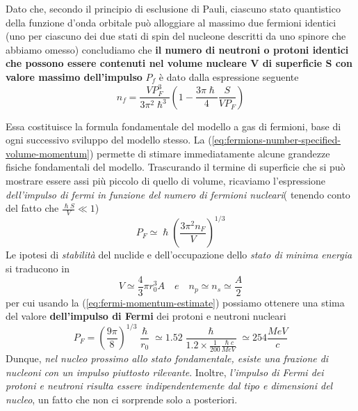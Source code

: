 Dato che, secondo il principio di esclusione di Pauli, ciascuno stato quantistico della funzione d’onda orbitale può alloggiare al massimo due fermioni identici (uno per ciascuno dei due stati di spin del nucleone descritti da uno spinore che abbiamo omesso) concludiamo che \textbf{il numero di neutroni o protoni identici che possono essere contenuti nel volume nucleare V di superficie S con valore massimo dell’impulso} $P_f$ è dato dalla espressione seguente
\begin{equation}
	n_{f} = \frac{V P_{F}^{3}}{3 \pi^{2}\hslash^{3}} \left( 1 - \frac{3\pi \hslash}{4} \frac{S}{VP_{F}} \right)
	\label{eq:fermions-number-specified-volume-momentum}
\end{equation}

Essa costituisce la formula fondamentale del modello a gas di fermioni, base di ogni successivo sviluppo del modello stesso.
La (\ref{eq:fermions-number-specified-volume-momentum}) permette di stimare immediatamente alcune grandezze fisiche fondamentali del modello. Trascurando il termine di superficie che si può mostrare essere assi più piccolo di quello di volume, ricaviamo l’espressione \emph{dell’impulso di fermi in funzione del numero di fermioni nucleari}( tenendo conto del fatto che $\frac{\hslash S}{V} \ll 1$)
\begin{equation}
	P_{F} \simeq \hslash \left(\frac{3\pi^{2}n_{F}}{V} \right)^{1/3}
	\label{eq:fermi-momentum-estimate}
\end{equation}
Le ipotesi di \emph{stabilità} del nuclide e dell'occupazione dello \emph{stato di minima energia} si traducono in
\[
	V \simeq \frac{4}{3}\pi r_{0}^{3}A \quad e \quad n_{p}\simeq n_{s} \simeq \frac{A}{2}
\]
per cui usando la (\ref{eq:fermi-momentum-estimate}) possiamo ottenere una stima del valore \textbf{dell’impulso di Fermi} dei protoni e neutroni nucleari
\[
P_{F} = \left( \frac{9\pi}{8} \right)^{1/3} \frac{\hslash}{r_{0}} \simeq 1.52 \frac{\hslash}{1.2 \times \frac{1}{200}\frac{\hslash c}{MeV}} \simeq 254 \frac{MeV}{c}
\]
Dunque, \emph{nel nucleo prossimo allo stato fondamentale, esiste una frazione di nucleoni con un impulso piuttosto rilevante}. Inoltre, \emph{l’impulso di Fermi dei protoni e neutroni risulta essere indipendentemente dal tipo e dimensioni del nucleo}, un fatto che non ci sorprende solo a posteriori.
\bigskip

